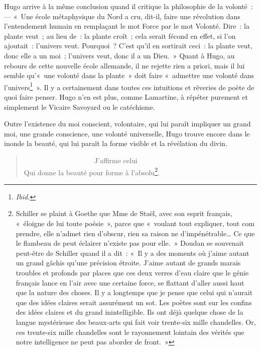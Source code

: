 \documentclass[french,twoside]{book} %
\begin{document}
Hugo arrive à la même conclusion quand il critique la philosophie de la volonté : — « Une école métaphysique du Nord a cru, dit-il, faire une révolution dans l’entendement humain en remplaçant le mot Force par le mot Volonté. Dire : la plante veut ; au lieu de : la plante croît ; cela serait fécond en effet, si l’on ajoutait : l’univers veut. Pourquoi ? C’est qu’il en sortirait ceci : la plante veut, donc elle a un moi ; l’univers veut, donc il a un Dieu. » Quant à Hugo, au rebours de cette nouvelle école allemande, il ne rejette rien a priori, mais il lui semble qu’« une volonté dans la plante » doit faire « admettre une volonté dans l’univers\footnote{\emph{Ibid.}} ». Il y a certainement dans toutes ces intuitions et rêveries de poète de quoi faire penser. Hugo n’en est plus, comme Lamartine, à répéter purement et simplement le Vicaire Savoyard ou le catéchisme.\par
Outre l’existence du moi conscient, volontaire, qui lui paraît impliquer un grand moi, une grande conscience, une volonté universelle, Hugo trouve encore dans le inonde la beauté, qui lui paraît la forme visible et la révélation du divin.\par


\begin{verse}
                    J’affirme celui\\
Qui donne la beauté pour forme à l’absolu\footnote{ Schiller se plaint à Goethe que Mme de Staël, avec son esprit français, « éloigne de lui toute poésie », parce que « voulant tout expliquer, tout com prendre, elle n’admet rien d’obscur, rien sa raison ne d’impénétrable… Ce que le flambeau de peut éclairer n’existe pas pour elle. » Doudan se souvenait peut-être de Schiller quand il a dit : « Il y a des moments où j’aime autant un grand gâchis qu’une précision étroite. J’aime autant de grands marais troubles et profonds par places que ces deux verres d’eau claire que le génie français lance en l’air avec une certaine force, se flattant d’aller aussi haut que la nature des choses. Il y a longtemps que je pense que celui qui n’aurait que des idées claires serait assurément un sot. Les poètes sont sur les confins des idées claires et du grand inintelligible. Ils ont déjà quelque chose de la langue mystérieuse des beaux-arts qui fait voir trente-six mille chandelles. Or, ces trente-six mille chandelles sont le rayonnement lointain des vérités que notre intelligence ne peut pas aborder de front. »}.\\
\end{verse}
\end{document}
